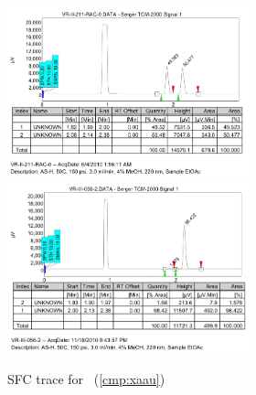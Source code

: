 \begin{figure}[h]
\centering
\includegraphics[width=2.75in]{chp_asymmetric/images/sfc/xaau-rac.png}
\includegraphics[width=2.75in]{chp_asymmetric/images/sfc/xaau.png}
\caption{SFC trace for \CMPxaau~(\ref{cmp:xaau})}
\vspace{-10pt}
\end{figure}

